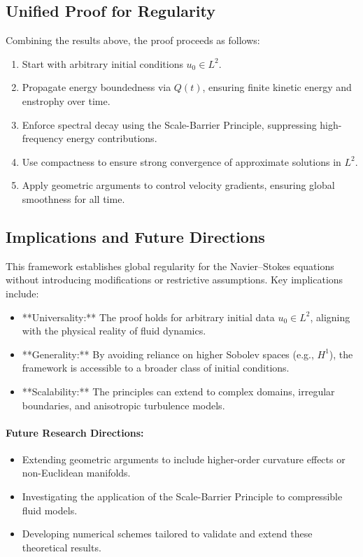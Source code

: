 \subsection{Unified Proof for Regularity}
Combining the results above, the proof proceeds as follows:
\begin{enumerate}
    \item Start with arbitrary initial conditions $u_0 \in L^2$.
    \item Propagate energy boundedness via $Q(t)$, ensuring finite kinetic energy and enstrophy over time.
    \item Enforce spectral decay using the Scale-Barrier Principle, suppressing high-frequency energy contributions.
    \item Use compactness to ensure strong convergence of approximate solutions in $L^2$.
    \item Apply geometric arguments to control velocity gradients, ensuring global smoothness for all time.
\end{enumerate}

\subsection{Implications and Future Directions}

This framework establishes global regularity for the Navier--Stokes equations without introducing modifications or restrictive assumptions. Key implications include:
\begin{itemize}
    \item **Universality:** The proof holds for arbitrary initial data $u_0 \in L^2$, aligning with the physical reality of fluid dynamics.
    \item **Generality:** By avoiding reliance on higher Sobolev spaces (e.g., $H^1$), the framework is accessible to a broader class of initial conditions.
    \item **Scalability:** The principles can extend to complex domains, irregular boundaries, and anisotropic turbulence models.
\end{itemize}

\paragraph{Future Research Directions:}
\begin{itemize}
    \item Extending geometric arguments to include higher-order curvature effects or non-Euclidean manifolds.
    \item Investigating the application of the Scale-Barrier Principle to compressible fluid models.
    \item Developing numerical schemes tailored to validate and extend these theoretical results.
\end{itemize}

